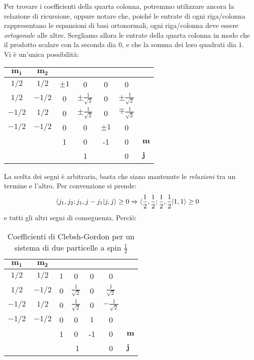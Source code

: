 \documentclass[../../FisicaTeorica.tex]{subfiles}
\begin{document}
Per trovare i coefficienti della quarta colonna, potremmo utilizzare ancora la relazione di ricursione, oppure notare che, poiché le entrate di ogni riga/colonna rappresentano le espansioni di basi ortonormali, ogni riga/colonna deve essere \textit{ortogonale} alle altre. Scegliamo allora le entrate della quarta colonna in modo che il prodotto scalare con la seconda dia $0$, e che la somma dei loro quadrati dia $1$. Vi è un'unica possibilità:
\begin{table}[H]
\centering
\begin{tabular}{@{}cccccc|l@{}}
\toprule
$\bm{m_1}$ & \multicolumn{1}{c|}{$\bm{m_2}$} &  &  &  &  &  \\ \midrule
$1/2$ & \multicolumn{1}{c|}{$1/2$} & $\pm 1$ & 0 & 0 & 0 &  \\
$1/2$ & \multicolumn{1}{c|}{$-1/2$} & 0  & $\pm\frac{1}{\sqrt{2}}$ & 0 & $\pm\frac{1}{\sqrt{2}}$  &  \\
$-1/2$ & \multicolumn{1}{c|}{$1/2$} & 0 & $\pm\frac{1}{\sqrt{2}}$ & 0 & $\mp\frac{1}{\sqrt{2}}$  &  \\
$-1/2$ & \multicolumn{1}{c|}{$-1/2$} & 0 & 0 & $\pm1$ & 0 &  \\ \midrule
 &  & 1 & 0 & -1 & 0 & $\bm{m}$ \\
 &  & \multicolumn{3}{c}{1} & 0 & $\bm{j}$ \\ \bottomrule
\end{tabular}
\label{tab:clebsh-gordon-4}
\end{table}
La scelta dei segni è arbitraria, basta che siano mantenute le \textit{relazioni} tra un termine e l'altro. Per convenzione si prende:
\begin{align*}
\braket{j_1, j_2; j_1, j-j_1|j,j} \geq 0 \Rightarrow \braket{\frac{1}{2},\frac{1}{2};\frac{1}{2},\frac{1}{2}|1,1} \geq 0
\end{align*} 
e tutti gli altri segni di conseguenza. Perciò:
\begin{table}[H]
\centering
\begin{tabular}{@{}cccccc|l@{}}
\toprule
$\bm{m_1}$ & \multicolumn{1}{c|}{$\bm{m_2}$} &  &  &  &  &  \\ \midrule
$1/2$ & \multicolumn{1}{c|}{$1/2$} & $ 1$ & 0 & 0 & 0 &  \\
$1/2$ & \multicolumn{1}{c|}{$-1/2$} & 0  & $\frac{1}{\sqrt{2}}$ & 0 & $\frac{1}{\sqrt{2}}$  &  \\
$-1/2$ & \multicolumn{1}{c|}{$1/2$} & 0 & $\frac{1}{\sqrt{2}}$ & 0 & $-\frac{1}{\sqrt{2}}$  &  \\
$-1/2$ & \multicolumn{1}{c|}{$-1/2$} & 0 & 0 & $1$ & 0 &  \\ \midrule
 &  & 1 & 0 & -1 & 0 & $\bm{m}$ \\
 &  & \multicolumn{3}{c}{1} & 0 & $\bm{j}$ \\ \bottomrule
\end{tabular}
\caption{Coefficienti di Clebsh-Gordon per un sistema di due particelle a spin $\frac{1}{2}$}
\label{tab:clebsh-gordon-5}
\end{table}
\end{document}
